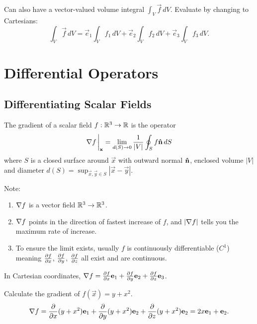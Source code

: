 \documentclass[10pt, a4paper]{article}
\begin{document}
\begin{remark}
    Can also have a vector-valued volume integral $\int_{V}\vec{f}\,dV$.
    Evaluate by changing to Cartesians:
    \[
    \int_{V}\vec{f}\,dV = \vec{e}_1\int_{V}f_1\,dV + \vec{e}_2\int_{V}f_2\,dV + \vec{e}_3\int_{V}f_3\,dV.
    \]
\end{remark}

\newpage

\section{Differential Operators}

\subsection{Differentiating Scalar Fields}

The gradient of a scalar field $f : \R ^ 3 \to \R$ is the operator
\[
\bnabla f\,\biggr|_{\vec{x}} = \lim_{d(S) \to 0}\frac{1}{|V|}\oint_{S}f\hvec{n}\,dS
\]
where $S$ is a closed surface around $\vec{x}$ with outward normal $\hvec{n}$,
enclosed volume $|V|$ and diameter $d(S) = \sup_{\vec{x}, \vec{y} \in S}|\vec{x} - \vec{y}|$.

Note:
\begin{enumerate}[label = (\roman*)]
    \item $\bnabla f$ is a vector field $\R ^ 3 \to \R ^ 3$.

    \item $\bnabla f$ points in the direction of fastest increase of $f$,
    and $|\bnabla f|$ tells you the maximum rate of increase.

    \item To ensure the limit exists,
    usually $f$ is continuously differentiable
    ($C ^ {1}$)
    meaning $\pd[f]{x}$,
    $\pd[f]{y}$,
    $\pd[f]{z}$ all exist and are continuous.
\end{enumerate}

\begin{proposition}\label{mathmethII:prop:gradincart}
    In Cartesian coordinates,
    $\bnabla f = \pd[f]{x}\vec{e}_1 + \pd[f]{y}\vec{e}_2 + \pd[f]{z}\vec{e}_3$.
\end{proposition}

\begin{example}
    Calculate the gradient of $f(\vec{x}) = y + x ^ 2$.
    \[
    \bnabla f = \pd{x}(y + x ^ 2)\vec{e}_1 + \pd{y}(y + x ^ 2)\vec{e}_2 + \pd{z}(y + x ^ 2)\vec{e}_2 = 2x\vec{e}_1 + \vec{e}_2.
    \]
\end{example}
\end{document}
